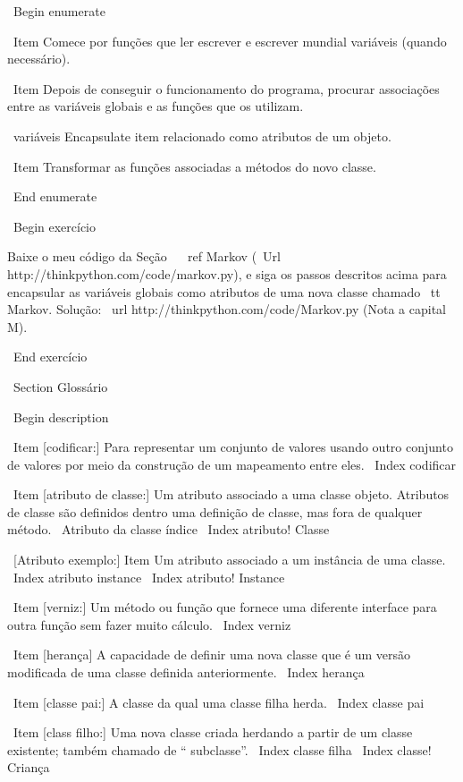 \documentclass[10pt]{book}
\begin{document}
{{{{{{{{{{{{{{{{{\ Begin {enumerate}

\ Item Comece por funções que ler escrever e escrever mundial
variáveis ​​(quando necessário).

\ Item Depois de conseguir o funcionamento do programa, procurar associações
entre as variáveis ​​globais e as funções que os utilizam.

\ variáveis ​​Encapsulate item relacionado como atributos de um objeto.

\ Item Transformar as funções associadas a métodos do novo
classe.

\ End {enumerate}


\ Begin {} exercício

Baixe o meu código da Seção ~ \ ref {} Markov
(\ Url {http://thinkpython.com/code/markov.py}), e siga os passos descritos
acima para encapsular as variáveis ​​globais como atributos de uma nova classe
chamado {\ tt Markov}. Solução: \ url {http://thinkpython.com/code/Markov.py}
(Nota a capital M).

\ End {} exercício




\ Section {} Glossário

\ Begin {description}

\ Item [codificar:] Para representar um conjunto de valores usando outro
conjunto de valores por meio da construção de um mapeamento entre eles.
\ Index {} codificar

\ Item [atributo de classe:] Um atributo associado a uma classe
objeto. Atributos de classe são definidos dentro
uma definição de classe, mas fora de qualquer método.
\ {Atributo da classe} índice
\ Index {atributo! Classe}

\ [Atributo exemplo:] Item Um atributo associado a um
instância de uma classe.
\ Index {atributo instance}
\ Index {atributo! Instance}

\ Item [verniz:] Um método ou função que fornece uma diferente
interface para outra função sem fazer muito cálculo.
\ Index {verniz}

\ Item [herança] A capacidade de definir uma nova classe que é um
versão modificada de uma classe definida anteriormente.
\ Index {herança}

\ Item [classe pai:] A classe da qual uma classe filha herda.
\ Index {classe pai}

\ Item [class filho:] Uma nova classe criada herdando a partir de um
classe existente; também chamado de `` subclasse''.
\ Index {classe filha}
\ Index {classe! Criança}

}}}}}}}}}}}}}}}}}
\end{document}
